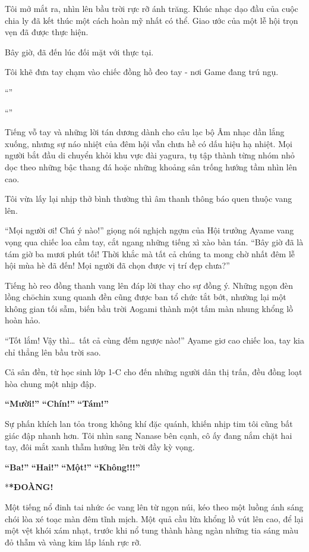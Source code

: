 \documentclass[../main.tex]{subfiles}
\begin{document}
Tôi mở mắt ra, nhìn lên bầu trời rực rỡ ánh trăng. Khúc nhạc dạo đầu của cuộc chia ly đã kết thúc một cách hoàn mỹ nhất có thể. Giao ước của một lễ hội trọn vẹn đã được thực hiện.

Bây giờ, đã đến lúc đối mặt với thực tại.

Tôi khẽ đưa tay chạm vào chiếc đồng hồ đeo tay - nơi Game đang trú ngụ.

``''

``''

\ct

Tiếng vỗ tay và những lời tán dương dành cho câu lạc bộ Âm nhạc dần lắng xuống, nhưng sự náo nhiệt của đêm hội vẫn chưa hề có dấu hiệu hạ nhiệt. Mọi người bắt đầu di chuyển khỏi khu vực đài yagura, tụ tập thành từng nhóm nhỏ dọc theo những bậc thang đá hoặc những khoảng sân trống hướng tầm nhìn lên cao.

Tôi vừa lấy lại nhịp thở bình thường thì âm thanh thông báo quen thuộc vang lên.

``Mọi người ơi! Chú ý nào!'' giọng nói nghịch ngợm của Hội trưởng Ayame vang vọng qua chiếc loa cầm tay, cắt ngang những tiếng xì xào bàn tán. ``Bây giờ đã là tám giờ ba mươi phút tối! Thời khắc mà tất cả chúng ta mong chờ nhất đêm lễ hội mùa hè đã đến! Mọi người đã chọn được vị trí đẹp chưa?''

Tiếng hò reo đồng thanh vang lên đáp lời thay cho sự đồng ý. Những ngọn đèn lồng chōchin xung quanh đền cũng được ban tổ chức tắt bớt, nhường lại một không gian tối sẫm, biến bầu trời Aogami thành một tấm màn nhung khổng lồ hoàn hảo.

``Tốt lắm! Vậy thì\dots\ tất cả cùng đếm ngược nào!'' Ayame giơ cao chiếc loa, tay kia chỉ thẳng lên bầu trời sao.

Cả sân đền, từ học sinh lớp 1-C cho đến những người dân thị trấn, đều đồng loạt hòa chung một nhịp đập.

\textbf{``Mười!''}
\textbf{``Chín!''}
\textbf{``Tám!''}

Sự phấn khích lan tỏa trong không khí đặc quánh, khiến nhịp tim tôi cũng bất giác đập nhanh hơn. Tôi nhìn sang Nanase bên cạnh, cô ấy đang nắm chặt hai tay, đôi mắt xanh thẫm hướng lên trời đầy kỳ vọng.

\textbf{``Ba!''}
\textbf{``Hai!''}
\textbf{``Một!''}
\textbf{``Không!!!''}

*\textbf{*ĐOÀNG!}

Một tiếng nổ đinh tai nhức óc vang lên từ ngọn núi, kéo theo một luồng ánh sáng chói lòa xé toạc màn đêm tĩnh mịch. Một quả cầu lửa khổng lồ vút lên cao, để lại một vệt khói xám nhạt, trước khi nổ tung thành hàng ngàn những tia sáng màu đỏ thẫm và vàng kim lấp lánh rực rỡ.
\end{document}
